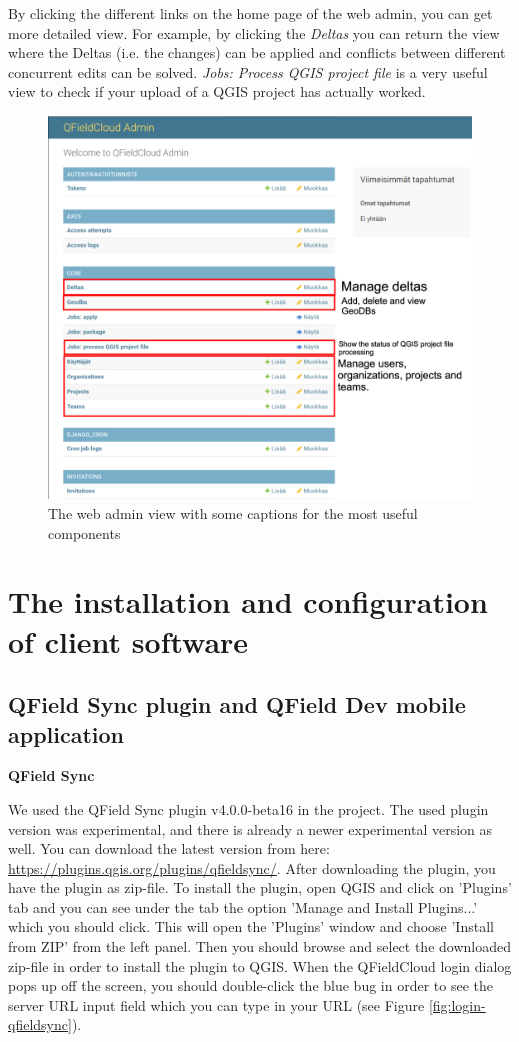 \documentclass{article}
\begin{document}
By clicking the different links on the home page of the web admin, you can get more detailed view. For example, by clicking the \emph{Deltas} you can return the view where the Deltas (i.e. the changes) can be applied and conflicts between different concurrent edits can be solved. \emph{Jobs: Process QGIS project file} is a very useful view to check if your upload of a QGIS project has actually worked. 

\begin{figure}[htb]
    \centering
    \includegraphics[width=1\textwidth]{web_admin_page.PNG}
    \caption{The web admin view with some captions for the most useful components}
    \label{fig:webAdmin}
\end{figure}
\section{The installation and configuration of client software}

\subsection{QField Sync plugin and QField Dev mobile application}

\textbf{QField Sync}

We used the QField Sync plugin v4.0.0-beta16 in the project. The used plugin version was experimental, and there is already a newer experimental version as well. You can download the latest version from here:
\url{https://plugins.qgis.org/plugins/qfieldsync/}. After downloading the plugin, you have the plugin as zip-file. To install the plugin, open QGIS and click on 'Plugins' tab and you can see under the tab the option 'Manage and Install Plugins...' which you should click. This will open the 'Plugins' window and choose 'Install from ZIP' from the left panel. Then you should browse and select the downloaded zip-file in order to install the plugin to QGIS. When the QFieldCloud login dialog pops up off the screen, you should double-click the blue bug in order to see the server URL input field which you can type in your URL (see Figure \ref{fig:login-qfieldsync}).
\end{document}
